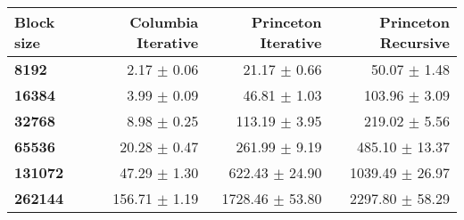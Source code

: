 \begin{tabular}{lrrr}\toprule
\textbf{Block size}  & \textbf{Columbia Iterative} & \textbf{Princeton Iterative} & \textbf{Princeton Recursive}\\\midrule
\textbf{8192}  & 2.17 $\pm$ 0.06 & 21.17 $\pm$ 0.66 & 50.07 $\pm$ 1.48\\
\textbf{16384}  & 3.99 $\pm$ 0.09 & 46.81 $\pm$ 1.03 & 103.96 $\pm$ 3.09\\
\textbf{32768}  & 8.98 $\pm$ 0.25 & 113.19 $\pm$ 3.95 & 219.02 $\pm$ 5.56\\
\textbf{65536}  & 20.28 $\pm$ 0.47 & 261.99 $\pm$ 9.19 & 485.10 $\pm$ 13.37\\
\textbf{131072}  & 47.29 $\pm$ 1.30 & 622.43 $\pm$ 24.90 & 1039.49 $\pm$ 26.97\\
\textbf{262144} & 156.71 $\pm$ 1.19 & 1728.46 $\pm$ 53.80 & 2297.80 $\pm$ 58.29\\
\bottomrule
\end{tabular}
